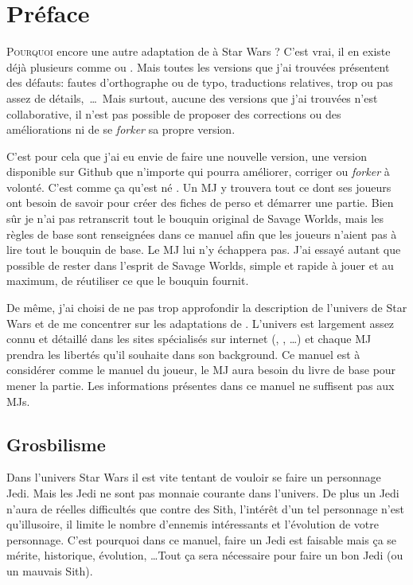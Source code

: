 \onecolumn
\section{Préface}

\lettrine{P}{ourquoi} encore une autre adaptation de  à {\jedifont Star Wars} ? C’est vrai, il en existe déjà plusieurs comme  ou . Mais toutes les versions que j’ai trouvées présentent des défauts: fautes d’orthographe ou de typo, traductions relatives, trop ou pas assez de détails,~\ldots~Mais surtout, aucune des versions que j’ai trouvées n’est collaborative, il n’est pas possible de proposer des corrections ou des améliorations ni de se \emph{forker} sa propre version.

C’est pour cela que j’ai eu envie de faire une nouvelle version, une version disponible sur Github que n’importe qui pourra améliorer, corriger ou \emph{forker} à volonté. C’est comme ça qu’est né {\jedifont \doctitle}. Un MJ y trouvera tout ce dont ses joueurs ont besoin de savoir pour créer des fiches de perso et démarrer une partie. Bien sûr je n’ai pas retranscrit tout le bouquin original de Savage Worlds, mais les règles de base sont renseignées dans ce manuel afin que les joueurs n’aient pas à lire tout le bouquin de base. Le MJ lui n’y échappera pas. J’ai essayé autant que possible de rester dans l’esprit de Savage Worlds, simple et rapide à jouer et au maximum, de réutiliser ce que le bouquin fournit.

De même, j’ai choisi de ne pas trop approfondir la description de l’univers de Star Wars et de me concentrer sur les adaptations de . L’univers est largement assez connu et détaillé dans les sites spécialisés sur internet (, , \ldots) et chaque MJ prendra les libertés qu’il souhaite dans son background. Ce manuel est à considérer comme le manuel du joueur, le MJ aura besoin du livre de base  pour mener la partie. Les informations présentes dans ce manuel ne suffisent pas aux MJs.

\subsection{Grosbilisme}
Dans l’univers Star Wars il est vite tentant de vouloir se faire un personnage Jedi. Mais les Jedi ne sont pas monnaie courante dans l’univers. De plus un Jedi n’aura de réelles difficultés que contre des Sith, l’intérêt d’un tel personnage n’est qu’illusoire, il limite le nombre d’ennemis intéressants et l’évolution de votre personnage. C’est pourquoi dans ce manuel, faire un Jedi est faisable mais ça se mérite, historique, évolution, \ldots Tout ça sera nécessaire pour faire un bon Jedi (ou un mauvais Sith).

